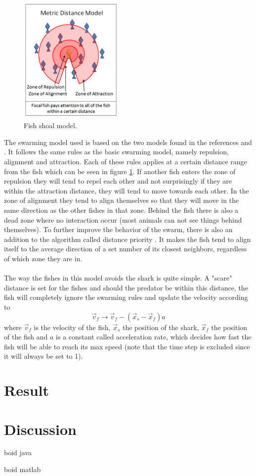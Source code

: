\documentclass[12pt,A4]{article}
\begin{document}
\begin{figure}
\centering
\includegraphics[width=0.45\textwidth]{swarmfig.png}
\caption{\label{fig:swarm} Fish shoal model.}
\end{figure}

The swarming model used is based on the two models found in the references \cite{javafish} and \cite{matlabfish}. It follows the same rules as the basic swarming model, namely repulsion, alignment and attraction. Each of these rules applies at a certain distance range from the fish which can be seen in figure \ref{fig:swarm}. If another fish enters the zone of repulsion they will tend to repel each other and not surprisingly if they are within the attraction distance, they will tend to move towards each other. In the zone of alignment they tend to align themselves so that they will move in the same direction as the other fishes in that zone. Behind the fish there is also a dead zone where no interaction occur (most animals can not see things behind themselves). To further improve the behavior of the swarm, there is also an addition to the algorithm called distance priority \cite{matlabfish}. It makes the fish tend to align itself to the average direction of a set number of its closest neighbors, regardless of which zone they are in.\\
\\
The way the fishes in this model avoids the shark is quite simple. A "scare" distance is set for the fishes and should the predator be within this distance, the fish will completely ignore the swarming rules and update the velocity according to
\begin{equation}
\vec{v}_f \rightarrow \vec{v}_f - (\vec{x}_s - \vec{x}_f)a
\end{equation}
where $\vec{v}_f$ is the velocity of the fish, $\vec{x}_s$ the position of the shark, $\vec{x}_f$ the position of the fish and $a$ is a constant called acceleration rate, which decides how fast the fish will be able to reach its max speed (note that the time step is excluded since it will always be set to 1).

\section{Result}

\section{Discussion}



\begin{thebibliography}{99}
 boid java

 boid matlab

\end{thebibliography}
\end{document}
